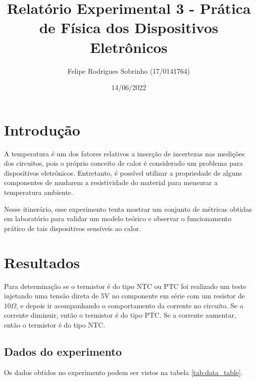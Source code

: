 \documentclass[12pt, onecolumn]{IEEEtran}
\title{Relatório Experimental 3 - Prática de Física dos Dispositivos Eletrônicos}
\author{Felipe Rodrigues Sobrinho (17/0141764)}
\date{14/06/2022}
\begin{document}
\maketitle

\section{Introdução}

A temperatura é um dos fatores relativos a inserção de incertezas nas medições dos circuitos, 
pois o próprio conceito de calor é considerado um problema para dispositivos eletrônicos.
Entretanto, é possível utilizar a propriedade de alguns componentes de mudarem a 
resistividade do material para mensurar a temperatura ambiente.

Nesse itinerário, esse experimento tenta mostrar um conjunto de métricas 
obtidas em laboratório para validar um modelo teórico e observar o 
funcionamento prático de tais dispositivos sensíveis ao calor.

\section{Resultados}

Para determinação se o termistor é do tipo NTC ou PTC foi realizado um teste 
injetando uma tensão direta de 5V no componente em série com um resistor 
de $10\Omega$, e depois ir acompanhando o 
comportamento da corrente no circuito. Se a corrente diminuir, então o termistor
é  do tipo PTC. Se a corrente aumentar, então o termistor é do tipo NTC.

\subsection{Dados do experimento}

Os dados obtidos no experimento podem ser vistos na tabela \ref{tab:data_table}.
\end{document}
